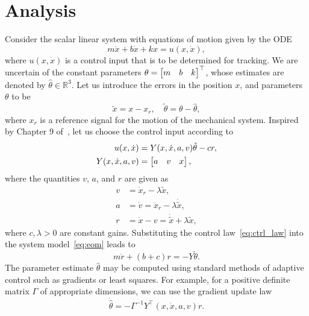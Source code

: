 \section{Analysis} 
\label{sec:analysis}

\noindent Consider the scalar linear system with equations of motion given by
the ODE
%
\begin{equation}
    m \ddot{x} + b\dot{x} + kx = u(x, \dot{x}),
    \label{eq:eom}
\end{equation}
%
where $u(x, \dot{x})$ is a control input that is to be determined for tracking.
We are uncertain of the constant parameters $\theta = \begin{bmatrix}m & b & k\end{bmatrix}^\top$,
whose estimates are denoted by $\hat{\theta} \in \mathbb{R}^3$. Let us introduce
the errors in the position $x$, and parameters $\theta$ to be \[ \tilde{x} = x -
x_r, \quad \tilde{\theta} = \theta - \hat{\theta}, \] where $x_r$ is a reference
signal for the motion of the mechanical system. Inspired by Chapter 9
of~\cite{spong2020robot}, let us choose the control input according to 
\begin{align}
    \begin{split}
        u(x, \dot{x}) &= Y(x, \dot{x}, a, v)\hat{\theta} - cr, \\
        Y(x, \dot{x}, a, v) &= \begin{bmatrix}a & v & x\end{bmatrix},
    \end{split}
    \label{eq:ctrl_law}
\end{align}
%
where the quantities $v$, $a$, and $r$ are given as
\begin{align*}
    v &= \dot{x}_r - \lambda \tilde{x}, \\
    a &= \dot{v} = \ddot{x}_r - \lambda \dot{\tilde{x}}, \\
    r &= \dot{x} - v = \dot{\tilde{x}} + \lambda \tilde{x},
\end{align*}
%
where $c, \lambda > 0$ are constant gains. Substituting the control
law~\eqref{eq:ctrl_law} into the system model~\eqref{eq:eom} leads to
%
\begin{equation}
    m\dot{r} + (b+c)r = -Y\tilde{\theta}.
    \label{eq:control_applied}
\end{equation}
%
The parameter estimate $\hat{\theta}$ may be computed using standard methods of
adaptive control such as gradients or least squares. For example, for a positive
definite matrix $\Gamma$ of appropriate dimensions, we can use the gradient
update law
%
\begin{equation}
    \dot{\hat{\theta}} = -\Gamma^{-1}Y^\top(x, \dot{x}, a, v)r.
    \label{eq:param_update}
\end{equation}

